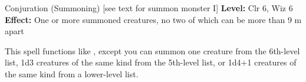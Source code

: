 {Conjuration (Summoning) [see text for summon monster I]}
{
	\textbf{Level:}
	Clr 6, Wiz 6\\
	\textbf{Effect:}
	One or more summoned creatures, no two of which can be more than 9 m apart\\
}
{
	This spell functions like , except you can summon one creature from the 6th-level list, 1d3 creatures of the same kind from the 5th-level list, or 1d4+1 creatures of the same kind from a lower-level list.

}
